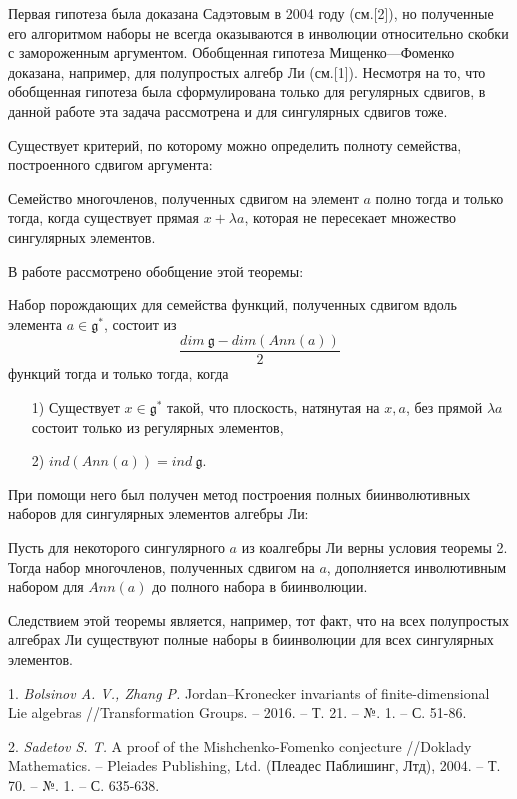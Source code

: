      Первая гипотеза была доказана Садэтовым в 2004 году (см.[2]), но полученные его алгоритмом наборы не всегда оказываются в инволюции относительно скобки с замороженным аргументом.
Обобщенная гипотеза Мищенко---Фоменко доказана, например, для полупростых алгебр Ли (см.[1]). Несмотря на то, что обобщенная гипотеза была сформулирована только для регулярных сдвигов, в данной работе эта задача рассмотрена и для сингулярных сдвигов тоже.


Существует критерий, по которому можно определить полноту семейства, построенного сдвигом аргумента:
\begin{theorem}
Семейство многочленов, полученных сдвигом на элемент $a$ полно тогда и только тогда, когда существует прямая $x+\lambda a$, которая не пересекает множество сингулярных элементов.
\end{theorem}
В работе рассмотрено обобщение этой теоремы:
\begin{theorem}
Набор порождающих для семейства функций, полученных сдвигом вдоль элемента $a\in \mathfrak{g}^*$, состоит из
$$\frac{dim \  \mathfrak{g}- dim (Ann(a))} 2$$
функций тогда и только тогда, когда
\begin{itemize}
    \item [1)] Существует $x\in \mathfrak{g}^*$ такой, что плоскость, натянутая на $x,a$, без прямой $\lambda a$ состоит только из регулярных элементов,
    \item[2)] $ind(Ann(a))=ind \  \mathfrak{g}$.
\end{itemize}
\end{theorem}
При помощи него был получен метод построения полных биинволютивных наборов для сингулярных элементов алгебры Ли:
\begin{theorem}
Пусть для некоторого сингулярного $a$ из коалгебры Ли верны условия теоремы 2.
Тогда набор многочленов, полученных сдвигом на $a$,  дополняется инволютивным набором для $Ann(a)$ до полного набора в биинволюции.
\end{theorem}
Следствием этой теоремы является, например, тот факт, что на всех полупростых алгебрах Ли существуют полные наборы в биинволюции для всех сингулярных элементов.
\litlist

1. {\it Bolsinov A. V., Zhang P.} Jordan–Kronecker invariants of finite-dimensional Lie algebras //Transformation Groups. – 2016. – Т. 21. – №. 1. – С. 51-86.

2. {\it Sadetov S. T.} A proof of the Mishchenko-Fomenko conjecture //Doklady Mathematics. – Pleiades Publishing, Ltd. (Плеадес Паблишинг, Лтд), 2004. – Т. 70. – №. 1. – С. 635-638.
